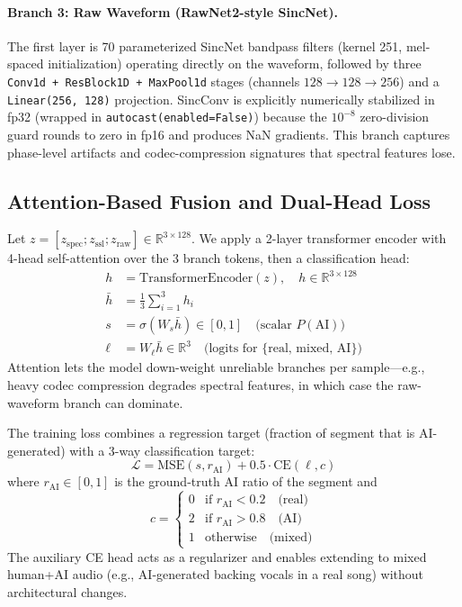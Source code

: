 \documentclass[10pt,twocolumn,a4paper]{article}
\begin{document}
\paragraph{Branch 3: Raw Waveform (RawNet2-style SincNet).}
The first layer is 70 parameterized SincNet bandpass filters (kernel 251, mel-spaced initialization) operating directly on the waveform, followed by three \texttt{Conv1d + ResBlock1D + MaxPool1d} stages (channels $128 \to 128 \to 256$) and a \texttt{Linear(256, 128)} projection. SincConv is explicitly numerically stabilized in fp32 (wrapped in \texttt{autocast(enabled=False)}) because the $10^{-8}$ zero-division guard rounds to zero in fp16 and produces NaN gradients. This branch captures phase-level artifacts and codec-compression signatures that spectral features lose.

\subsection{Attention-Based Fusion and Dual-Head Loss}
\label{sec:fusion}

Let $z = [z_{\text{spec}}; z_{\text{ssl}}; z_{\text{raw}}] \in \mathbb{R}^{3 \times 128}$. We apply a 2-layer transformer encoder with 4-head self-attention over the 3 branch tokens, then a classification head:
\begin{align}
h &= \text{TransformerEncoder}(z), \quad h \in \mathbb{R}^{3 \times 128} \\
\bar{h} &= \tfrac{1}{3}\sum_{i=1}^{3} h_i \\
s &= \sigma(W_s \bar{h}) \in [0,1] \quad\text{(scalar $P(\text{AI})$)} \\
\ell &= W_\ell \bar{h} \in \mathbb{R}^{3} \quad\text{(logits for \{real, mixed, AI\})}
\end{align}
Attention lets the model down-weight unreliable branches per sample---e.g., heavy codec compression degrades spectral features, in which case the raw-waveform branch can dominate.

The training loss combines a regression target (fraction of segment that is AI-generated) with a 3-way classification target:
\begin{equation}
\mathcal{L} = \text{MSE}(s, r_{\text{AI}}) + 0.5 \cdot \text{CE}(\ell, c)
\label{eq:loss}
\end{equation}
where $r_{\text{AI}} \in [0,1]$ is the ground-truth AI ratio of the segment and
\begin{equation}
c = \begin{cases}
0 & \text{if } r_{\text{AI}} < 0.2 \quad\text{(real)} \\
2 & \text{if } r_{\text{AI}} > 0.8 \quad\text{(AI)} \\
1 & \text{otherwise} \quad\text{(mixed)}
\end{cases}
\end{equation}
The auxiliary CE head acts as a regularizer and enables extending to mixed human+AI audio (e.g., AI-generated backing vocals in a real song) without architectural changes.
\end{document}
